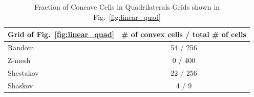 \documentclass[preprint,10pt]{elsarticle}
\newcommand{\fig}[1]{Fig.~\ref{#1}}                      %
\begin{document}
\begin{table}[!htbp]
	\centering
		\begin{tabular}{|l||c|}
		\hline
		Grid  of \fig{fig:linear_quad}    & \# of convex cells / total \# of cells \\ \hline\hline
		Random    & 54 / 256 \\ \hline
		Z-mesh    &  0 / 400 \\ \hline
		Shestakov & 22 / 256 \\ \hline
		Shaskov   &  4 /   9 \\ \hline		
		\end{tabular}
	\caption{Fraction of Concave Cells in Quadrilaterals Grids shown in \fig{fig:linear_quad}}
	\label{tab:FractionOfConcaveCellsInQuadrilateralsGridsShownInFigFig}
\end{table}
\end{document}
